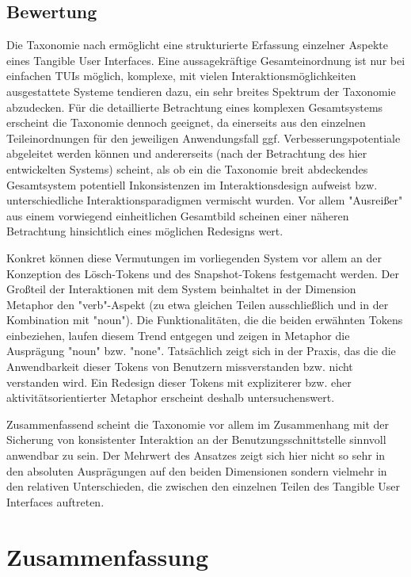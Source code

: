 \subsection{Bewertung}

Die Taxonomie nach \citeauthor{Fishkin04} ermöglicht eine strukturierte Erfassung einzelner Aspekte eines Tangible User Interfaces. Eine aussagekräftige Gesamteinordnung ist nur bei einfachen \glspl{TUI} möglich, komplexe, mit vielen Interaktionsmöglichkeiten ausgestattete Systeme tendieren dazu, ein sehr breites Spektrum der Taxonomie abzudecken. Für die detaillierte Betrachtung eines komplexen Gesamtsystems erscheint die Taxonomie dennoch geeignet, da einerseits aus den einzelnen Teileinordnungen für den jeweiligen Anwendungsfall ggf. Verbesserungspotentiale abgeleitet werden können und andererseits (nach der Betrachtung des hier entwickelten Systems) scheint, als ob ein die Taxonomie breit abdeckendes Gesamtsystem potentiell Inkonsistenzen im Interaktionsdesign aufweist bzw. unterschiedliche Interaktionsparadigmen vermischt wurden. Vor allem "Ausreißer" aus einem vorwiegend einheitlichen Gesamtbild scheinen einer näheren Betrachtung hinsichtlich eines möglichen Redesigns wert.

Konkret können diese Vermutungen im vorliegenden System vor allem an der Konzeption des Lösch-Tokens und des Snapshot-Tokens festgemacht werden. Der Großteil der Interaktionen mit dem System beinhaltet in der Dimension Metaphor den "verb"-Aspekt (zu etwa gleichen Teilen ausschließlich und in der Kombination mit "noun"). Die Funktionalitäten, die die beiden erwähnten Tokens einbeziehen, laufen diesem Trend entgegen und zeigen in Metaphor die Ausprägung "noun" bzw. "none". Tatsächlich zeigt sich in der Praxis, das die die Anwendbarkeit dieser Tokens von Benutzern missverstanden bzw. nicht verstanden wird. Ein Redesign dieser Tokens mit expliziterer bzw. eher aktivitätsorientierter Metaphor erscheint deshalb untersuchenswert.

Zusammenfassend scheint die Taxonomie vor allem im Zusammenhang mit der Sicherung von konsistenter Interaktion an der Benutzungsschnittstelle sinnvoll anwendbar zu sein. Der Mehrwert des Ansatzes zeigt sich hier nicht so sehr in den absoluten Ausprägungen auf den beiden Dimensionen sondern vielmehr in den relativen Unterschieden, die zwischen den einzelnen Teilen des Tangible User Interfaces auftreten.


\section{Zusammenfassung}

